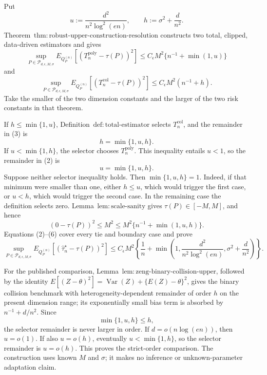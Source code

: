 Put
\[
 u:=\frac{d^2}{n^2\log^2(en)},\qquad h:=\sigma^2+\frac d{n^2}.
\tag{1}
\]
Theorem~\(\mathrm{thm:robust\text{-}upper\text{-}construction\text{-}resolution}\) constructs two total, clipped, data-driven estimators and gives
\[
 \sup_{P\in\mathcal P_{d,\epsilon,M,\sigma}}
 E_{Q_P^{(n)}}[(T_n^{\mathrm{poly}}-\tau(P))^2]
 \le C_\epsilon M^2\{n^{-1}+\min(1,u)\}
\tag{2}
\]
and
\[
 \sup_{P\in\mathcal P_{d,\epsilon,M,\sigma}}
 E_{Q_P^{(n)}}[(T_n^{\mathrm{col}}-\tau(P))^2]
 \le C_\epsilon M^2(n^{-1}+h).
\tag{3}
\]
Take the smaller of the two dimension constants and the larger of the two risk constants in that theorem.

If \(h\le\min\{1,u\}\), Definition~\(\mathrm{def:total\text{-}estimator}\) selects \(T_n^{\mathrm{col}}\), and the remainder in (3) is
\[
 h=\min\{1,u,h\}.
\tag{4}
\]
If \(u<\min\{1,h\}\), the selector chooses \(T_n^{\mathrm{poly}}\).  This inequality entails \(u<1\), so the remainder in (2) is
\[
 u=\min\{1,u,h\}.
\tag{5}
\]
Suppose neither selector inequality holds.  Then \(\min\{1,u,h\}=1\).  Indeed, if that minimum were smaller than one, either \(h\le u\), which would trigger the first case, or \(u<h\), which would trigger the second case.  In the remaining case the definition selects zero.  Lemma~\(\mathrm{lem:scale\text{-}sanity}\) gives \(\tau(P)\in[-M,M]\), and hence
\[
 (0-\tau(P))^2\le M^2
 \le M^2\{n^{-1}+\min(1,u,h)\}.
\tag{6}
\]
Equations (2)--(6) cover every tie and boundary case and prove
\[
 \sup_{P\in\mathcal P_{d,\epsilon,M,\sigma}}
 E_{Q_P^{(n)}}[(\widehat\tau_n^\star-\tau(P))^2]
 \le C_\epsilon M^2\left\{\frac1n+
 \min\left(1,\frac{d^2}{n^2\log^2(en)},\sigma^2+\frac d{n^2}\right)\right\}.
\tag{7}
\]

For the published comparison, Lemma~\(\mathrm{lem:zeng\text{-}binary\text{-}collision\text{-}upper}\), followed by the identity \(E[(Z-\theta)^2]=\operatorname{Var}(Z)+\{E(Z)-\theta\}^2\), gives the binary collision benchmark with heterogeneity-dependent remainder of order \(h\) on the present dimension range; its exponentially small bias term is absorbed by \(n^{-1}+d/n^2\).  Since
\[
 \min\{1,u,h\}\le h,
\tag{8}
\]
the selector remainder is never larger in order.  If \(d=o(n\log(en))\), then \(u=o(1)\).  If also \(u=o(h)\), eventually \(u<\min\{1,h\}\), so the selector remainder is \(u=o(h)\).  This proves the strict-order comparison.  The construction uses known \(M\) and \(\sigma\); it makes no inference or unknown-parameter adaptation claim.